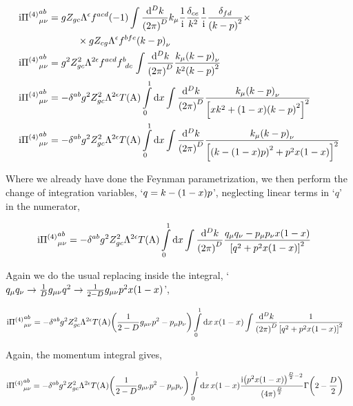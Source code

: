 \begin{align}
    \im {\Pi^{\qty(4)}}^{ab}_{\mu\nu}&=gZ_{gc}\Lambda^{\epsilon}f^{acd}\qty(-1)\int\frac{\dd[D]{k}}{\qty(2\pi)^D}k_\mu\frac1\im\frac{\delta_{ce}}{k^2}\frac1\im\frac{\delta_{fd}}{\qty(k-p)^2}\times\nonumber\\
    &\quad\quad\quad\times gZ_{cg}\Lambda^\epsilon f^{bfe}\qty(k-p)_\nu\nonumber\\
    \im {\Pi^{\qty(4)}}^{ab}_{\mu\nu}&=g^2Z_{gc}^2\Lambda^{2\epsilon}f^{acd}\tensor{f}{^b_d_c}\int\frac{\dd[D]{k}}{\qty(2\pi)^D}\frac{k_\mu\qty(k-p)_\nu}{k^2\qty(k-p)^2}\nonumber\\
    \im {\Pi^{\qty(4)}}^{ab}_{\mu\nu}&=-\delta^{ab}g^2Z_{gc}^2\Lambda^{2\epsilon}T\qty(\textnormal{A})\int\limits_0^1\dd{x}\int\frac{\dd[D]{k}}{\qty(2\pi)^D}\frac{k_\mu\qty(k-p)_\nu}{\qty[xk^2+\qty(1-x)\qty(k-p)^2]^2}\nonumber\\
    \im {\Pi^{\qty(4)}}^{ab}_{\mu\nu}&=-\delta^{ab}g^2Z_{gc}^2\Lambda^{2\epsilon}T\qty(\textnormal{A})\int\limits_0^1\dd{x}\int\frac{\dd[D]{k}}{\qty(2\pi)^D}\frac{k_\mu\qty(k-p)_\nu}{\qty[\qty(k-\qty(1-x)p)^2+p^2x\qty(1-x)]^2}\nonumber
\end{align}

Where we already have done the Feynman parametrization, we then perform the change of integration variables, `$q=k-\qty(1-x)p$', neglecting linear terms in `$q$' in the numerator,

\begin{align}
    \textnormal{i} {\Pi^{\qty(4)}}^{ab}_{\mu\nu}&=-\delta^{ab}g^2Z_{gc}^2\Lambda^{2\epsilon}T\qty(\textnormal{A})\int\limits_0^1\dd{x}\int\frac{\dd[D]{k}}{\qty(2\pi)^D}\frac{q_\mu q_\nu-p_\mu p_\nu x\qty(1-x)}{\qty[q^2+p^2x\qty(1-x)]^2}\nonumber
\end{align}

Again we do the usual replacing inside the integral, `$q_\mu q_\nu\rightarrow \frac1Dg_{\mu\nu}q^2\rightarrow\frac{1}{2-D}g_{\mu\nu}p^2x\qty(1-x)$',

\begin{align}
    \textnormal{i} {\Pi^{\qty(4)}}^{ab}_{\mu\nu}&=-\delta^{ab}g^2Z_{gc}^2\Lambda^{2\epsilon}T\qty(\textnormal{A})\qty(\frac{1}{2-D}g_{\mu\nu}p^2-p_\mu p_\nu)\int\limits_0^1\dd{x}x\qty(1-x)\int\frac{\dd[D]{k}}{\qty(2\pi)^D}\frac{1}{\qty[q^2+p^2x\qty(1-x)]^2}\nonumber
\end{align}

Again, the momentum integral gives,

\begin{align}
    \textnormal{i} {\Pi^{\qty(4)}}^{ab}_{\mu\nu}&=-\delta^{ab}g^2Z_{gc}^2\Lambda^{2\epsilon}T\qty(\textnormal{A})\qty(\frac{1}{2-D}g_{\mu\nu}p^2-p_\mu p_\nu)\int\limits_0^1\dd{x}x\qty(1-x)\frac{\textnormal{i}\qty(p^2x\qty(1-x))^{\frac D2-2}}{\qty(4\pi)^{\frac D2}}\Gamma\qty(2-\frac D2)\nonumber
\end{align}


